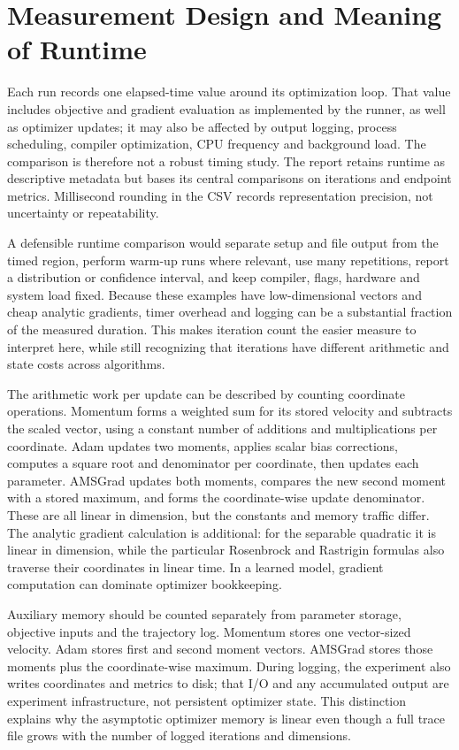 \documentclass[conference]{IEEEtran}
\begin{document}
\section{Measurement Design and Meaning of Runtime}
Each run records one elapsed-time value around its optimization loop. That value includes objective and gradient evaluation as implemented by the runner, as well as optimizer updates; it may also be affected by output logging, process scheduling, compiler optimization, CPU frequency and background load. The comparison is therefore not a robust timing study. The report retains runtime as descriptive metadata but bases its central comparisons on iterations and endpoint metrics. Millisecond rounding in the CSV records representation precision, not uncertainty or repeatability.

A defensible runtime comparison would separate setup and file output from the timed region, perform warm-up runs where relevant, use many repetitions, report a distribution or confidence interval, and keep compiler, flags, hardware and system load fixed. Because these examples have low-dimensional vectors and cheap analytic gradients, timer overhead and logging can be a substantial fraction of the measured duration. This makes iteration count the easier measure to interpret here, while still recognizing that iterations have different arithmetic and state costs across algorithms.

The arithmetic work per update can be described by counting coordinate operations. Momentum forms a weighted sum for its stored velocity and subtracts the scaled vector, using a constant number of additions and multiplications per coordinate. Adam updates two moments, applies scalar bias corrections, computes a square root and denominator per coordinate, then updates each parameter. AMSGrad updates both moments, compares the new second moment with a stored maximum, and forms the coordinate-wise update denominator. These are all linear in dimension, but the constants and memory traffic differ. The analytic gradient calculation is additional: for the separable quadratic it is linear in dimension, while the particular Rosenbrock and Rastrigin formulas also traverse their coordinates in linear time. In a learned model, gradient computation can dominate optimizer bookkeeping.

Auxiliary memory should be counted separately from parameter storage, objective inputs and the trajectory log. Momentum stores one vector-sized velocity. Adam stores first and second moment vectors. AMSGrad stores those moments plus the coordinate-wise maximum. During logging, the experiment also writes coordinates and metrics to disk; that I/O and any accumulated output are experiment infrastructure, not persistent optimizer state. This distinction explains why the asymptotic optimizer memory is linear even though a full trace file grows with the number of logged iterations and dimensions.
\end{document}

